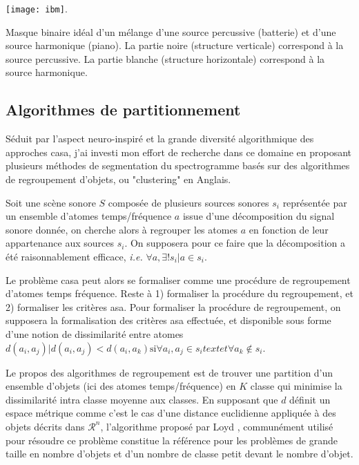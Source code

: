   \begin{marginfigure}
    \texttt{[image: ibm]}.
    \caption{Masque binaire idéal d'un mélange d'une source percussive (batterie) et d'une source harmonique (piano). La partie noire (structure verticale) correspond à la source percussive. La partie blanche (structure horizontale) correspond à la source harmonique.}
  \end{marginfigure}

  \subsection{Algorithmes de partitionnement}

  Séduit par l'aspect neuro-inspiré et la grande diversité algorithmique des approches casa, j'ai investi mon effort de recherche dans ce domaine en proposant plusieurs méthodes de segmentation du spectrogramme basés sur des algorithmes de regroupement d'objets, ou "clustering" en Anglais.

  Soit une scène sonore $S$ composée de plusieurs sources sonores $s_i$ représentée par un ensemble d'atomes temps/fréquence $a$ issue d'une décomposition du signal sonore donnée, on cherche alors à regrouper les atomes $a$ en fonction de leur appartenance aux sources $s_i$. On supposera pour ce faire que la décomposition a été raisonnablement efficace, \textit{i.e.} $\forall a, \exists ! s_i | a \in s_i$.

  Le problème casa peut alors se formaliser comme une procédure de regroupement d'atomes temps fréquence. Reste à 1) formaliser la procédure du regroupement, et 2) formaliser les critères asa. Pour formaliser la procédure de regroupement, on supposera la formalisation des critères asa effectuée, et disponible sous forme d'une notion de dissimilarité entre atomes $d(a_i, a_j) | d(a_i, a_j) < d(a_i, a_k) \text{si} \forall a_i, a_j \in s_i text{et} \forall a_k \notin s_i$.

  Le propos des algorithmes de regroupement est de trouver une partition d'un ensemble d'objets (ici des atomes temps/fréquence) en $K$ classe qui minimise la dissimilarité intra classe moyenne aux classes. En supposant que $d$ définit un espace métrique comme c'est le cas d'une distance euclidienne appliquée à des objets décrits dans $\mathcal{R}^n$, l'algorithme proposé par Loyd \cite{}, communément utilisé pour résoudre ce problème constitue la référence pour les problèmes de grande taille en nombre d'objets et d'un nombre de classe petit devant le nombre d'objet.

